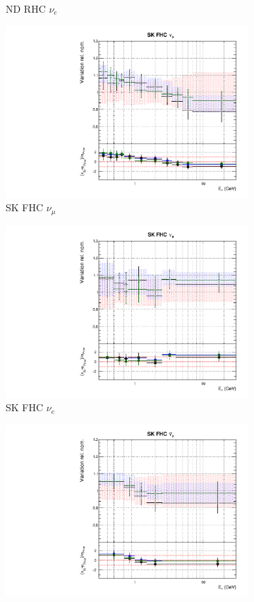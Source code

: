 \begin{figure}
\begin{subfigure}{0.24\textwidth}
  \caption{ND RHC $\nu_e$}
\end{subfigure}
\begin{subfigure}{0.24\textwidth}
  \centering
  \includegraphics[width=0.95\linewidth]{figs/fgdfitsflux_8}
  \caption{SK FHC $\nu_{\mu}$}
\end{subfigure}
\begin{subfigure}{0.24\textwidth}
  \centering
  \includegraphics[width=0.95\linewidth]{figs/fgdfitsflux_9}
  \caption{SK FHC $\nu_e$}
\end{subfigure}
\begin{subfigure}{0.24\textwidth}
  \centering
  \includegraphics[width=0.95\linewidth]{figs/fgdfitsflux_10}

\end{subfigure}
\end{figure}
